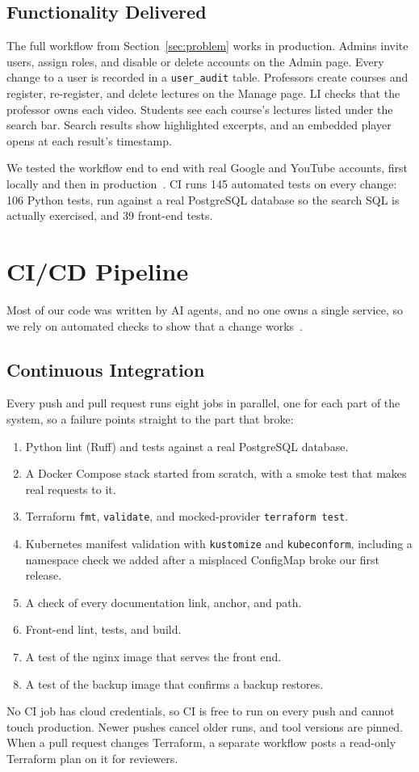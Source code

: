 \documentclass[conference]{IEEEtran}
\begin{document}
\subsection{Functionality Delivered}
The full workflow from Section~\ref{sec:problem} works in production.
Admins invite users, assign roles, and disable or delete accounts on the
Admin page. Every change to a user is recorded in a \texttt{user\_audit}
table. Professors create courses and register, re-register, and delete
lectures on the Manage page. LI checks that the professor owns each video.
Students see each course's lectures listed under the search bar. Search
results show highlighted excerpts, and an embedded player opens at each
result's timestamp.

We tested the workflow end to end with real Google and YouTube accounts,
first locally and then in production~\cite{yttest}. CI runs 145 automated
tests on every change: 106 Python tests, run against a real PostgreSQL
database so the search SQL is actually exercised, and 39 front-end tests.

\section{CI/CD Pipeline}
\label{sec:cicd}
Most of our code was written by AI agents, and no one owns a single
service, so we rely on automated checks to show that a change
works~\cite{release}.

\subsection{Continuous Integration}
Every push and pull request runs eight jobs in parallel, one for each part
of the system, so a failure points straight to the part that broke:
\begin{enumerate}
\item Python lint (Ruff) and tests against a real PostgreSQL database.
\item A Docker Compose stack started from scratch, with a smoke test that
makes real requests to it.
\item Terraform \texttt{fmt}, \texttt{validate}, and mocked-provider
\texttt{terraform test}.
\item Kubernetes manifest validation with \texttt{kustomize} and
\texttt{kubeconform}, including a namespace check we added after a
misplaced ConfigMap broke our first release.
\item A check of every documentation link, anchor, and path.
\item Front-end lint, tests, and build.
\item A test of the nginx image that serves the front end.
\item A test of the backup image that confirms a backup restores.
\end{enumerate}
No CI job has cloud credentials, so CI is free to run on every push and
cannot touch production. Newer pushes cancel older runs, and tool versions
are pinned. When a pull request changes Terraform, a separate workflow
posts a read-only Terraform plan on it for reviewers.
\end{document}
